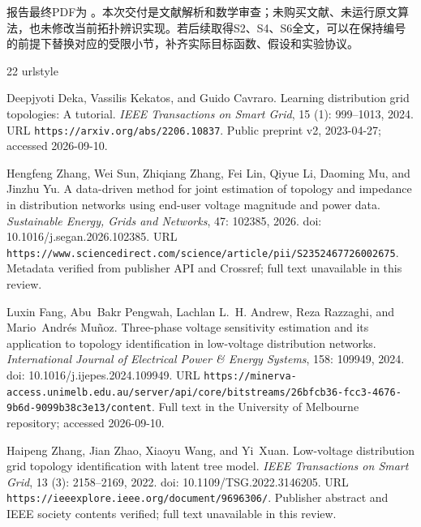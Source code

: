 \documentclass[UTF8,11pt,fontset=fandol]{ctexart}
\theoremstyle{remark}
\numberwithin{equation}{section}
\begin{document}
报告最终PDF为 。本次交付是文献解析和数学审查；未购买文献、未运行原文算法，也未修改当前拓扑辨识实现。若后续取得S2、S4、S6全文，可以在保持编号的前提下替换对应的受限小节，补齐实际目标函数、假设和实验协议。



\clearpage

\begin{thebibliography}{22}
\providecommand{\natexlab}[1]{#1}
\providecommand{\url}[1]{\texttt{#1}}
\expandafter\ifx\csname urlstyle\endcsname\relax
  \providecommand{\doi}[1]{doi: #1}\else
  \providecommand{\doi}{doi: \begingroup \urlstyle{rm}\Url}\fi

Deepjyoti Deka, Vassilis Kekatos, and Guido Cavraro.
\newblock Learning distribution grid topologies: A tutorial.
\newblock \emph{IEEE Transactions on Smart Grid}, 15 (1):
  999--1013, 2024.
\newblock URL \url{https://arxiv.org/abs/2206.10837}.
\newblock Public preprint v2, 2023-04-27; accessed 2026-09-10.

Hengfeng Zhang, Wei Sun, Zhiqiang Zhang, Fei Lin, Qiyue Li, Daoming Mu, and
  Jinzhu Yu.
\newblock A data-driven method for joint estimation of topology and impedance
  in distribution networks using end-user voltage magnitude and power data.
\newblock \emph{Sustainable Energy, Grids and Networks}, 47: 102385,
  2026.
\newblock \doi{10.1016/j.segan.2026.102385}.
\newblock URL
  \url{https://www.sciencedirect.com/science/article/pii/S2352467726002675}.
\newblock Metadata verified from publisher API and Crossref; full text
  unavailable in this review.

Luxin Fang, Abu~Bakr Pengwah, Lachlan L.~H. Andrew, Reza Razzaghi, and
  Mario~Andr{\'e}s Mu{\~n}oz.
\newblock Three-phase voltage sensitivity estimation and its application to
  topology identification in low-voltage distribution networks.
\newblock \emph{International Journal of Electrical Power \& Energy Systems},
  158: 109949, 2024.
\newblock \doi{10.1016/j.ijepes.2024.109949}.
\newblock URL
  \url{https://minerva-access.unimelb.edu.au/server/api/core/bitstreams/26bfcb36-fcc3-4676-9b6d-9099b38c3e13/content}.
\newblock Full text in the University of Melbourne repository; accessed
  2026-09-10.

Haipeng Zhang, Jian Zhao, Xiaoyu Wang, and Yi~Xuan.
\newblock Low-voltage distribution grid topology identification with latent
  tree model.
\newblock \emph{IEEE Transactions on Smart Grid}, 13 (3):
  2158--2169, 2022.
\newblock \doi{10.1109/TSG.2022.3146205}.
\newblock URL \url{https://ieeexplore.ieee.org/document/9696306/}.
\newblock Publisher abstract and IEEE society contents verified; full text
  unavailable in this review.


\end{thebibliography}
\end{document}
